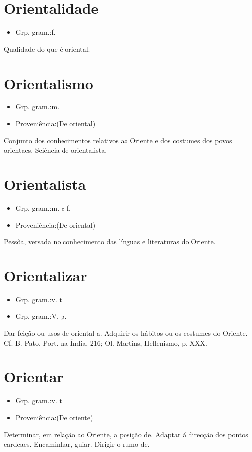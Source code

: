 \section{Orientalidade}
\begin{itemize}
\item {Grp. gram.:f.}
\end{itemize}
Qualidade do que é oriental.
\section{Orientalismo}
\begin{itemize}
\item {Grp. gram.:m.}
\end{itemize}
\begin{itemize}
\item {Proveniência:(De \textunderscore oriental\textunderscore )}
\end{itemize}
Conjunto dos conhecimentos relativos ao Oriente e dos costumes dos povos orientaes.
Sciência de orientalista.
\section{Orientalista}
\begin{itemize}
\item {Grp. gram.:m.  e  f.}
\end{itemize}
\begin{itemize}
\item {Proveniência:(De \textunderscore oriental\textunderscore )}
\end{itemize}
Pessôa, versada no conhecimento das línguas e literaturas do Oriente.
\section{Orientalizar}
\begin{itemize}
\item {Grp. gram.:v. t.}
\end{itemize}
\begin{itemize}
\item {Grp. gram.:V. p.}
\end{itemize}
Dar feição ou usos de oriental a.
Adquirir os hábitos ou os costumes do Oriente. Cf. B. Pato, \textunderscore Port. na Índia\textunderscore , 216; Ol. Martins, \textunderscore Hellenismo\textunderscore , p. XXX.
\section{Orientar}
\begin{itemize}
\item {Grp. gram.:v. t.}
\end{itemize}
\begin{itemize}
\item {Proveniência:(De \textunderscore oriente\textunderscore )}
\end{itemize}
Determinar, em relação ao Oriente, a posição de. Adaptar á direcção dos pontos cardeaes.
Encaminhar, guiar.
Dirigir o rumo de.
